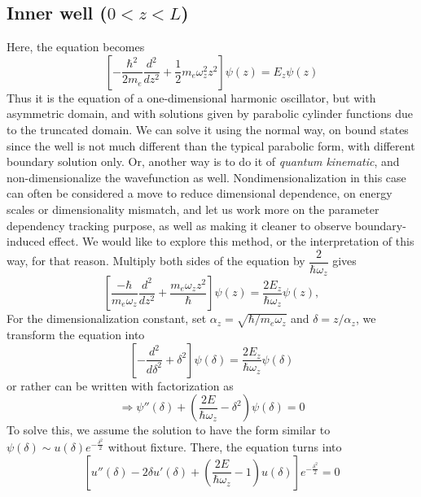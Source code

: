 \documentclass[%
 reprint,
 amsmath,amssymb,
 aps,
]{revtex4-2}
\begin{document}
\subsection{Inner well ($0 < z < L$)}
Here, the equation becomes
\begin{equation}
    \left[ -\frac{\hbar^2}{2m_e} \frac{d^2}{dz^2} + \frac{1}{2} m_e \omega_z^2 z^2 \right] \psi(z) = E_{z} \psi(z)
\end{equation}
Thus it is the equation of a one-dimensional harmonic oscillator, but with asymmetric domain, and with solutions given by parabolic cylinder functions due to the truncated domain. We can solve it using the normal way, on bound states since the well is not much different than the typical parabolic form, with different boundary solution only. Or, another way is to do it of \textit{quantum kinematic}, and non-dimensionalize the wavefunction as well. Nondimensionalization in this case can often be considered a move to reduce dimensional dependence, on energy scales or dimensionality mismatch, and let us work more on the parameter dependency tracking purpose, as well as making it cleaner to observe boundary-induced effect. We would like to explore this method, or the interpretation of this way, for that reason. Multiply both sides of the equation by $\dfrac{2}{\hbar \omega_z}$ gives
\begin{equation}
    \left[ \frac{-\hbar}{m_e \omega_z} \frac{d^2}{dz^2} + \frac{m_e \omega_z z^2}{\hbar} \right] \psi(z) = \frac{2E_{z}}{\hbar \omega_z} \psi(z),
\end{equation}
For the dimensionalization constant, set  $\alpha_z = \sqrt{\hbar /m_e \omega_z}$ and $ \delta = z/\alpha_{z}$, we transform the equation into 
\begin{equation}
    \left[ -\frac{d^2}{d\delta^2} + \delta^2 \right] \psi(\delta) = \frac{2E_{z}}{\hbar \omega_z} \psi(\delta)
\end{equation}
or rather can be written with factorization as
\begin{equation}
    \Rightarrow \psi''(\delta) + \left( \frac{2E}{\hbar \omega_z} - \delta^2 \right) \psi(\delta) = 0
\end{equation}
To solve this, we assume the solution to have the form similar to $\psi(\delta) \sim u(\delta) e^{-\frac{\delta^2}{2}}$ without fixture. There, the equation turns into
\begin{equation}
    \left[ u''(\delta) - 2 \delta u'(\delta) + \left( \frac{2E}{\hbar \omega_z} - 1 \right) u(\delta) \right] e^{-\frac{\delta^2}{2}} = 0
\end{equation}
\end{document}
